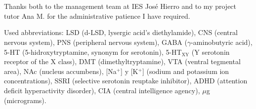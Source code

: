 \section*{}
\thispagestyle{empty}

Thanks both to the management team at IES José Hierro and to my project tutor Ana M. for the administrative patience I have required.

Used abbreviations: LSD (d-LSD, lysergic acid's diethylamide), CNS (central nervous system), PNS (peripheral nervous system), GABA ($\gamma$-aminobutyric acid), 5-HT (5-hidroxytryptamine, synonym for serotonin), 5-HT$_{\textrm{XY}}$ (Y serotonin receptor of the X class), DMT (dimethyltryptamine), VTA (ventral tegmental area), NAc (nucleus accumbens), [Na$^+$] y [K$^+$] (sodium and potassium ion concentrations), SSRI (selective serotonin reuptake inhibitor), ADHD (attention deficit hyperactivity disorder), CIA (central intelligence agency), $\mu$g (micrograms).
\clearpage
